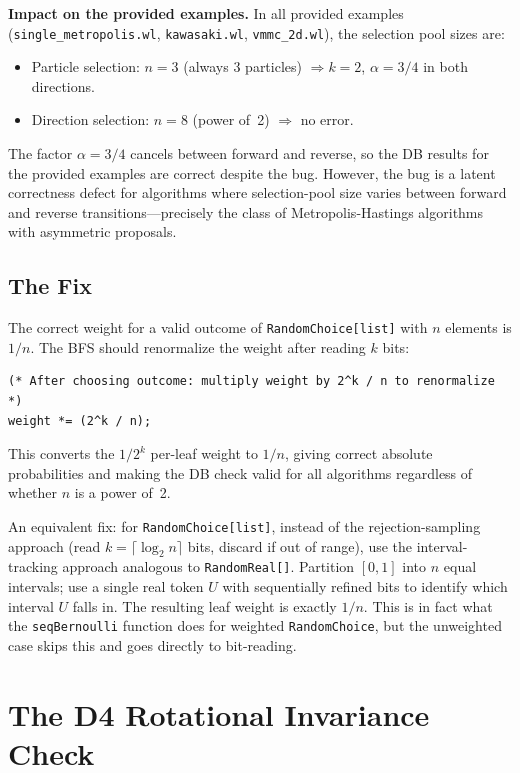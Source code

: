 \documentclass[12pt,a4paper]{article}
\theoremstyle{critical}
\theoremstyle{remark}
\begin{document}
\textbf{Impact on the provided examples.} In all provided examples
(\texttt{single\_metropolis.wl}, \texttt{kawasaki.wl}, \texttt{vmmc\_2d.wl}),
the selection pool sizes are:
\begin{itemize}
\item Particle selection: $n=3$ (always 3 particles) $\Rightarrow k=2$, $\alpha=3/4$ in both directions.
\item Direction selection: $n=8$ (power of~2) $\Rightarrow$ no error.
\end{itemize}
The factor $\alpha=3/4$ cancels between forward and reverse, so the DB results for the
provided examples are correct despite the bug. However, the bug is a latent correctness
defect for algorithms where selection-pool size varies between forward and reverse
transitions---precisely the class of Metropolis-Hastings algorithms with asymmetric
proposals.

\subsection{The Fix}

The correct weight for a valid outcome of \texttt{RandomChoice[list]} with $n$ elements
is $1/n$. The BFS should renormalize the weight after reading $k$ bits:
\begin{lstlisting}
(* After choosing outcome: multiply weight by 2^k / n to renormalize *)
weight *= (2^k / n);
\end{lstlisting}
This converts the $1/2^k$ per-leaf weight to $1/n$, giving correct absolute
probabilities and making the DB check valid for all algorithms regardless of whether $n$
is a power of~2.

An equivalent fix: for \texttt{RandomChoice[list]}, instead of the rejection-sampling
approach (read $k=\lceil\log_2 n\rceil$ bits, discard if out of range), use the
interval-tracking approach analogous to \texttt{RandomReal[]}. Partition $[0,1]$ into $n$
equal intervals; use a single real token $U$ with sequentially refined bits to identify
which interval $U$ falls in. The resulting leaf weight is exactly $1/n$. This is in fact
what the \texttt{seqBernoulli} function does for weighted \texttt{RandomChoice}, but the
unweighted case skips this and goes directly to bit-reading.

\section{The D4 Rotational Invariance Check}
\label{sec:d4}
\end{document}
